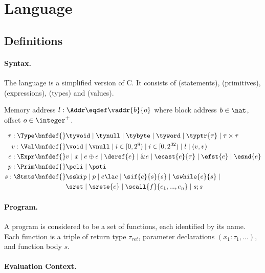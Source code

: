 \section{Language}
\label{sec:language}

\subsection{Definitions}

\paragraph{Syntax.}\label{p:type}

The language is a simplified version of C. It consists of \Stmts{} (statements), \Prim{} (primitives),
\Expr{} (expressions), \Type{} (types) and \Val{} (values).

Memory address $l: \Addr \eqdef \vaddr{b}{o}$ where block address $b \in \nat$, offset $o \in \integer^{+}$.

\begin{align*}
    \tau : \Type \bnfdef{}&
        \tyvoid \mid \tynull \mid \tybyte \mid \tyword \mid \typtr{\tau} \mid \tau \times \tau
\\
    v : \Val \bnfdef{}&
        \void \mid \vnull \mid i \in [0, 2^8) \mid i \in [0, 2^{32}) \mid l \mid (v, v)
\\
    e : \Expr \bnfdef{}&
        v \mid x \mid e \oplus e \mid \deref{e} \mid \& e \mid \ecast{e}{\tau} \mid \efst{e} \mid \esnd{e}
\\
    p : \Prim \bnfdef{}&
        \pcli \mid \psti
\\
    s : \Stmts \bnfdef{}&
        \sskip \mid p \mid e \la e \mid \sif{e}{s}{s} \mid \swhile{e}{s} \mid \\&
        \sret \mid \srete{e} \mid \scall{f}{e_1, ..., e_n} \mid s ; s
\\
\end{align*}

\paragraph{Program.}

A program is considered to be a set of functions, each identified by its name. Each
function is a triple of return type $\tau_{ret}$, parameter declarations $(x_1 : \tau_1, ...)$,
and function body $s$.

\paragraph{Evaluation Context.}

